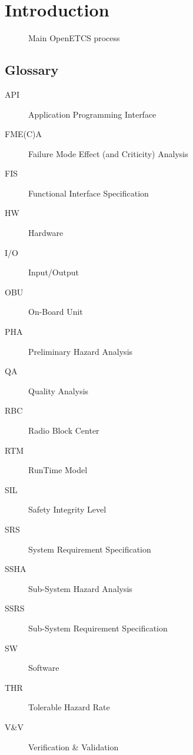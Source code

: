 

\chapter{Introduction}
\label{sec:intro}

\begin{comment}
MPD : Todo
\end{comment}

 \begin{figure}
  \centering
  \caption{Main OpenETCS process}
  \label{fig:main_process}
\end{figure}






\section{Glossary}
\label{sec:glossary}

\begin{description}
\item[API] Application Programming Interface
\item[FME(C)A] Failure Mode Effect (and Criticity) Analysis
\item[FIS] Functional Interface Specification
\item[HW] Hardware
\item[I/O] Input/Output
\item[OBU] On-Board Unit
\item[PHA] Preliminary Hazard Analysis
\item[QA] Quality Analysis
\item[RBC] Radio Block Center
\item[RTM] RunTime Model
\item[SIL] Safety Integrity Level
\item[SRS] System Requirement Specification
\item[SSHA] Sub-System Hazard Analysis
\item[SSRS] Sub-System Requirement Specification
\item[SW] Software
\item[THR] Tolerable Hazard Rate
\item[V\&V] Verification \& Validation
\end{description}



